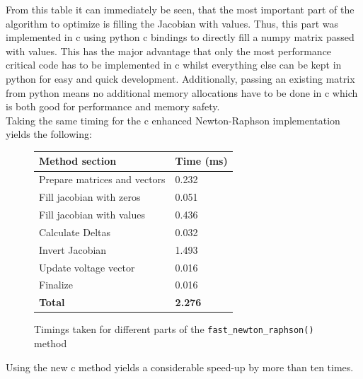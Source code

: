 From this table it can immediately be seen, that the most important part
of the algorithm to optimize is filling the Jacobian with values. Thus, this
part was implemented in c using python c bindings to directly fill a numpy
matrix passed with values. This has the major advantage that only the most performance
critical code has to be implemented in c whilst everything else can be kept in python
for easy and quick development. Additionally, passing an existing matrix from python
means no additional memory allocations have to be done in c which is both good for performance 
and memory safety.\\
Taking the same timing for the c enhanced Newton-Raphson implementation yields the following:

\begin{figure}[H]
    \begin{center}
        \begin{tabular}{ll}
            \textbf{Method section} & \textbf{Time (ms)}\\
            \hline
            Prepare matrices and vectors & 0.232\\
            Fill jacobian with zeros &  0.051\\
            Fill jacobian with values & 0.436\\
            Calculate Deltas &      0.032\\
            Invert Jacobian &      1.493\\
            Update voltage vector & 0.016\\
            Finalize & 0.016\\
            \hline
            \textbf{Total} & \textbf{2.276}
        \end{tabular}
    \end{center}
\caption{Timings taken for different parts of the \texttt{fast\_newton\_raphson()} method}
\end{figure}

Using the new c method yields a considerable speed-up by more than ten times.\\

